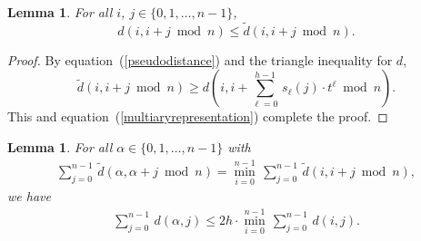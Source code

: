 \documentclass[letterpaper,12pt]{article}
\newtheorem{lemma}[theorem]{Lemma}
\begin{document}
\begin{lemma}\label{pseudodistanceislarger}
For all $i$, $j\in\{0,1,\ldots,n-1\}$,
$$
d\left(i,i+j\bmod{n}\right)
\le \tilde{d}\left(i,i+j\bmod{n}\right).
$$
\end{lemma}
\begin{proof}
By equation~(\ref{pseudodistance}) and the triangle inequality for $d$,
$$
\tilde{d}\left(i,i+j\bmod{n}\right)
\ge
d\left(i,i+\sum_{\ell=0}^{h-1}\, s_\ell(j)\cdot
t^\ell\bmod{n}\right).
$$
This and
equation~(\ref{multiaryrepresentation})
complete the proof.
\end{proof}



\begin{lemma}
\label{approximationratiolemma}
For all
$\alpha\in\{0,1,\ldots,n-1\}$
with
\begin{eqnarray}
\sum_{j=0}^{n-1}\,\tilde{d}\left(\alpha,\alpha+j\bmod{n}\right)
=
\min_{i=0}^{n-1}\,
\sum_{j=0}^{n-1}\,\tilde{d}\left(i,i+j\bmod{n}\right),
\label{theoptimalpointwithrespecttopseudodistance}
\end{eqnarray}
we have
\begin{eqnarray}
\sum_{j=0}^{n-1}\, d\left(\alpha,j\right)
\le 2h
\cdot
\min_{i=0}^{n-1}\,
\sum_{j=0}^{n-1}\, d\left(i,j\right).
\label{approximationinequality}
\end{eqnarray}
\end{lemma}
\end{document}
